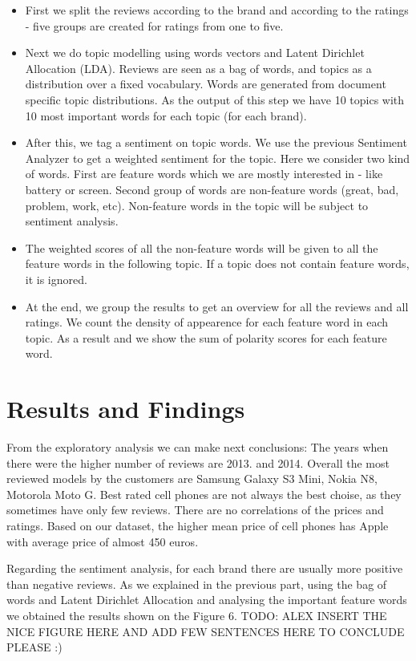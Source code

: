 \documentclass[11pt]{article}
\begin{document}
 \begin{itemize}
  \item First we split the reviews according to the brand and according to the ratings - five groups are created for ratings from one to five.
  \item Next we do topic modelling using words vectors and Latent Dirichlet Allocation (LDA). Reviews are seen as a bag of words, and topics as a distribution over a fixed vocabulary. Words are generated from document specific topic distributions. As the output of this step we have 10 topics with 10 most important words for each topic (for each brand).
  \item After this, we tag a sentiment on topic words. We use the previous Sentiment Analyzer to get a weighted sentiment for the topic. Here we consider two kind of words. First are feature words which we are mostly interested in - like battery or screen. Second group of words are non-feature words (great, bad, problem, work, etc). Non-feature words in the topic will be subject to sentiment analysis. 
  \item The weighted scores of all the non-feature words will be given to all the feature words in the following topic. If a topic does not contain feature words, it is ignored.
  \item At the end, we group the results to get an overview for all the reviews and all ratings. We count the density of appearence for each feature word in each topic. As a result and we show the sum of polarity scores for each feature word.
\end{itemize}


\section{Results and Findings}
From the exploratory analysis we can make next conclusions: The years when there were the higher number of reviews are 2013. and 2014. Overall the most reviewed models by the customers are Samsung Galaxy S3 Mini, Nokia N8, Motorola Moto G. Best rated cell phones are not always the best choise, as they sometimes have only few reviews. There are no correlations of the prices and ratings. Based on our dataset, the higher mean price of cell phones has Apple with average price of almost 450 euros. 
 \par

Regarding the sentiment analysis, for each brand there are usually more positive than negative reviews. As we explained in the previous part, using the bag of words and Latent Dirichlet Allocation and analysing the important feature words we obtained the results shown on the Figure 6.  TODO: ALEX INSERT THE NICE FIGURE HERE AND ADD FEW SENTENCES HERE TO CONCLUDE PLEASE :)
\end{document}
